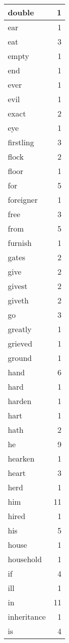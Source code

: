 \begin{center}
\begin{longtable}{l|r}
double & 1 \\ \hline
ear & 1 \\ \hline
eat & 3 \\ \hline
empty & 1 \\ \hline
end & 1 \\ \hline
ever & 1 \\ \hline
evil & 1 \\ \hline
exact & 2 \\ \hline
eye & 1 \\ \hline
firstling & 3 \\ \hline
flock & 2 \\ \hline
floor & 1 \\ \hline
for & 5 \\ \hline
foreigner & 1 \\ \hline
free & 3 \\ \hline
from & 5 \\ \hline
furnish & 1 \\ \hline
gates & 2 \\ \hline
give & 2 \\ \hline
givest & 2 \\ \hline
giveth & 2 \\ \hline
go & 3 \\ \hline
greatly & 1 \\ \hline
grieved & 1 \\ \hline
ground & 1 \\ \hline
hand & 6 \\ \hline
hard & 1 \\ \hline
harden & 1 \\ \hline
hart & 1 \\ \hline
hath & 2 \\ \hline
he & 9 \\ \hline
hearken & 1 \\ \hline
heart & 3 \\ \hline
herd & 1 \\ \hline
him & 11 \\ \hline
hired & 1 \\ \hline
his & 5 \\ \hline
house & 1 \\ \hline
household & 1 \\ \hline
if & 4 \\ \hline
ill & 1 \\ \hline
in & 11 \\ \hline
inheritance & 1 \\ \hline
is & 4 \\ \hline

\end{longtable}
\end{center}
